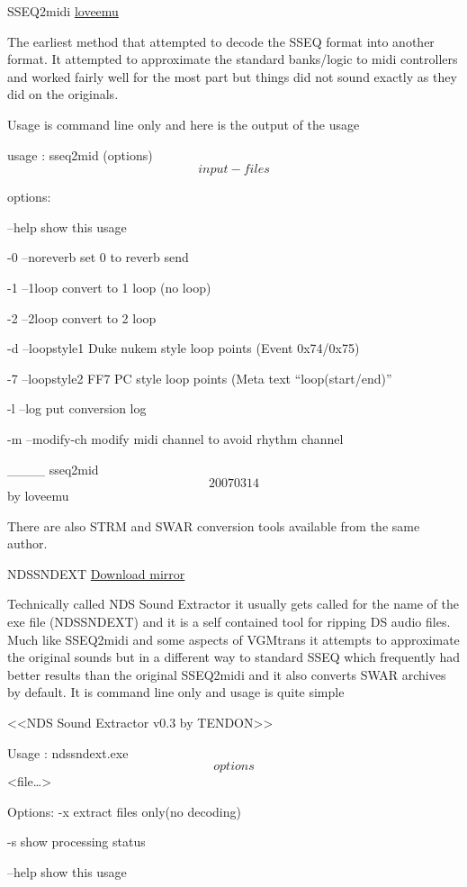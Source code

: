 \documentclass[
]{book}
\begin{document}
SSEQ2midi \href{https://github.com/loveemu/loveemu-lab}{loveemu}

The earliest method that attempted to decode the SSEQ format into another format. It attempted to approximate the standard banks/logic to midi controllers and worked fairly well for the most part but things did not sound exactly as they did on the originals.

Usage is command line only and here is the output of the usage

usage : sseq2mid (options) \[input-files\]

options:

--help show this usage

-0 --noreverb set 0 to reverb send

-1 --1loop convert to 1 loop (no loop)

-2 --2loop convert to 2 loop

-d --loopstyle1 Duke nukem style loop points (Event 0x74/0x75)

-7 --loopstyle2 FF7 PC style loop points (Meta text ``loop(start/end)''

-l --log put conversion log

-m --modify-ch modify midi channel to avoid rhythm channel

\_\_\_\_ sseq2mid \[20070314\] by loveemu

There are also STRM and SWAR conversion tools available from the same author.

NDSSNDEXT \href{http://filetrip.net/nds-downloads/utilities/latest-nds-sound-extractor-f28818.html}{Download mirror}

Technically called NDS Sound Extractor it usually gets called for the name of the exe file (NDSSNDEXT) and it is a self contained tool for ripping DS audio files. Much like SSEQ2midi and some aspects of VGMtrans it attempts to approximate the original sounds but in a different way to standard SSEQ which frequently had better results than the original SSEQ2midi and it also converts SWAR archives by default. It is command line only and usage is quite simple

\textless﻿\textless NDS Sound Extractor v0.3 by TENDON\textgreater﻿\textgreater{}

Usage : ndssndext.exe \[options\] \textless file\ldots\textgreater{}

Options: -x extract files only(no decoding)

-s show processing status

--help show this usage
\end{document}
